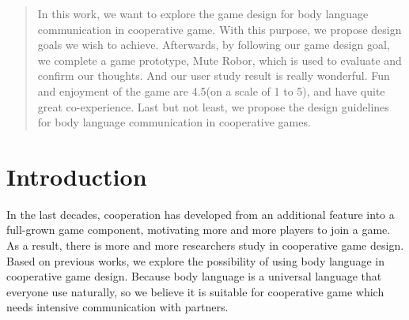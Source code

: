 \documentclass{sigchi}
\begin{document}
\begin{abstract}

In this work, we want to explore the game design for body language communication in cooperative game. With this purpose, we propose design goals we wish to achieve. Afterwards, by following our game design goal, we complete a game prototype, Mute Robor, which is used to evaluate and confirm our thoughts. And our user study result is really wonderful. Fun and enjoyment of the game are 4.5(on a scale of 1 to 5), and have quite great co-experience. Last but not least, we propose the design guidelines for body language communication in cooperative games.


\end{abstract}




\section{Introduction}

In the last decades, cooperation has developed from an additional feature into a full-grown game component, motivating more and more players to join a game. As a result, there is more and more researchers study in cooperative game design. Based on previous works, we explore the possibility of using body language in cooperative game design. Because body language is a universal language that everyone use naturally, so we believe it is suitable for cooperative game which needs intensive communication with partners.
\end{document}
